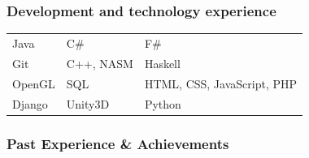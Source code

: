 \documentclass{article}
\begin{document}
	\subsubsection{Development and technology experience}
	
	\begin{tabular}{| l | l | l |}
		Java   & C\#     & F\#                          \\
		Git    & C++, NASM     & Haskell                     \\
		OpenGL & SQL     & HTML, CSS, JavaScript, PHP   \\
		Django & Unity3D & Python                     
	\end{tabular}

	\subsubsection{Past Experience \& Achievements}
\end{document}
